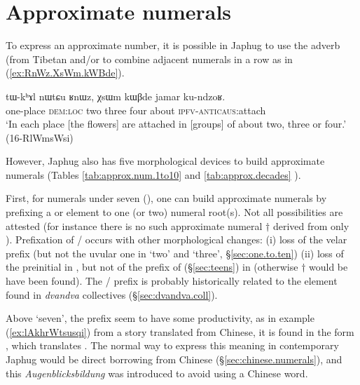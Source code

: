\section{Approximate numerals} \label{sec:approx.numerals}
To express an approximate number, it is possible in Japhug to use the adverb  (from Tibetan  and/or to combine adjacent numerals in a row as in (\ref{ex:RnWz.XsWm.kWBde}).

\begin{exe}
\ex \label{ex:RnWz.XsWm.kWBde}
\gll tɯ-kʰɤl nɯtɕu ʁnɯz, χsɯm kɯβde jamar ku-ndzoʁ. \\
one-place \textsc{dem}:\textsc{loc} two three four about \textsc{ipfv}-\textsc{anticaus}:attach \\
\glt `In each place [the flowers] are attached in [groups] of about two, three or four.' (16-RlWmsWsi)
\end{exe}

However, Japhug also has five morphological devices to build approximate numerals (Tables \ref{tab:approx.num.1to10} and \ref{tab:approx.decades} ).

First, for numerals under seven (), one can build approximate numerals by prefixing a  or  element to one (or two) numeral root(s). Not all possibilities are attested (for instance there is no such approximate numeral $\dagger$ derived from only ).  Prefixation of  /  occurs with other morphological changes: (i) loss of the velar  prefix (but not the uvular one in `two' and `three', §\ref{sec:one.to.ten}) (ii) loss of the  preinitial in  , but not of the  prefix of  (§\ref{sec:teens}) in  (otherwise $\dagger$ would be have been found). The  /  prefix is probably historically related to the  element found in \textit{dvandva} collectives (§\ref{sec:dvandva.coll}).  


Above `seven', the  prefix seem to have some productivity, as in example (\ref{ex:lAkhrWtsusqi}) from a story translated from Chinese, it is found in the form , which translates . The normal way to express this meaning in contemporary Japhug would be direct borrowing from Chinese (§\ref{sec:chinese.numerals}), and this \textit{Augenblicksbildung} was introduced to avoid using a Chinese word.

